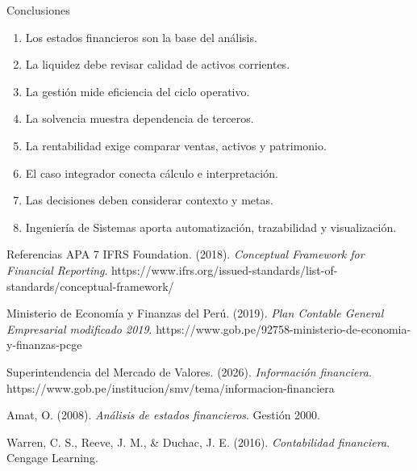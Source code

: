 \begin{frame}{Conclusiones}
\small
\begin{enumerate}
  \item Los estados financieros son la base del análisis.
  \item La liquidez debe revisar calidad de activos corrientes.
  \item La gestión mide eficiencia del ciclo operativo.
  \item La solvencia muestra dependencia de terceros.
  \item La rentabilidad exige comparar ventas, activos y patrimonio.
  \item El caso integrador conecta cálculo e interpretación.
  \item Las decisiones deben considerar contexto y metas.
  \item Ingeniería de Sistemas aporta automatización, trazabilidad y visualización.
\end{enumerate}
\end{frame}

\begin{frame}{Referencias APA 7}
\scriptsize
IFRS Foundation. (2018). \textit{Conceptual Framework for Financial Reporting}. https://www.ifrs.org/issued-standards/list-of-standards/conceptual-framework/

\vspace{0.4em}
Ministerio de Economía y Finanzas del Perú. (2019). \textit{Plan Contable General Empresarial modificado 2019}. https://www.gob.pe/92758-ministerio-de-economia-y-finanzas-pcge

\vspace{0.4em}
Superintendencia del Mercado de Valores. (2026). \textit{Información financiera}. https://www.gob.pe/institucion/smv/tema/informacion-financiera

\vspace{0.4em}
Amat, O. (2008). \textit{Análisis de estados financieros}. Gestión 2000.

\vspace{0.4em}
Warren, C. S., Reeve, J. M., \& Duchac, J. E. (2016). \textit{Contabilidad financiera}. Cengage Learning.
\end{frame}
